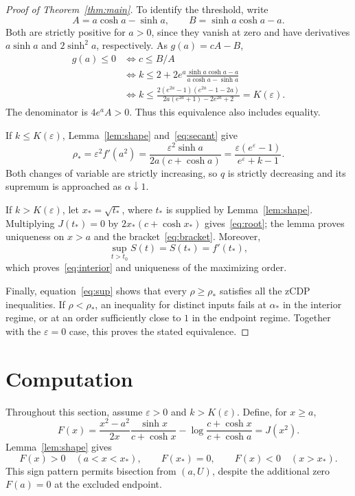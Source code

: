 \documentclass[11pt]{article}
\begin{document}
\begin{proof}[Proof of Theorem~\ref{thm:main}]
To identify the threshold, write
\[
 A=a\cosh a-\sinh a,\qquad B=\sinh a\cosh a-a.
\]
Both are strictly positive for $a>0$, since they vanish at zero and have
derivatives $a\sinh a$ and $2\sinh^2a$, respectively. As $g(a)=cA-B$,
\begin{align*}
 g(a)\leq0
 &\iff c\leq B/A\\
 &\iff k\leq2+2e^a\frac{\sinh a\cosh a-a}{a\cosh a-\sinh a}\\
 &\iff k\leq
 \frac{2(e^{2a}-1)(e^{2a}-1-2a)}
 {2a(e^{2a}+1)-2e^{2a}+2}=K(\varepsilon).
\end{align*}
The denominator is $4e^aA>0$. Thus this equivalence also includes equality.

If $k\leq K(\varepsilon)$, Lemma~\ref{lem:shape}
and~\eqref{eq:secant} give
\[
 \rho_* =\varepsilon^2 f'(a^2)
 =\frac{\varepsilon^2\sinh a}{2a(c+\cosh a)}
 =\frac{\varepsilon(e^\varepsilon-1)}{e^\varepsilon+k-1}.
\]
Both changes of variable are strictly increasing, so $q$ is strictly
decreasing and its supremum is approached as $\alpha\downarrow1$.

If $k>K(\varepsilon)$, let $x_*=\sqrt{t_*}$, where $t_*$ is supplied by
Lemma~\ref{lem:shape}. Multiplying $J(t_*)=0$ by
$2x_*(c+\cosh x_*)$ gives~\eqref{eq:root}; the lemma proves uniqueness
on $x>a$ and the bracket~\eqref{eq:bracket}. Moreover,
\[
 \sup_{t>t_0}S(t)=S(t_*)=f'(t_*),
\]
which proves~\eqref{eq:interior} and uniqueness of the maximizing order.

Finally, equation~\eqref{eq:sup} shows that every $\rho\geq\rho_*$
satisfies all the zCDP inequalities. If $\rho<\rho_*$, an inequality for
distinct inputs fails at $\alpha_*$ in the interior regime, or at an order
sufficiently close to $1$ in the endpoint regime. Together with the
$\varepsilon=0$ case, this proves the stated equivalence.
\end{proof}

\section{Computation}

Throughout this section, assume $\varepsilon>0$ and $k>K(\varepsilon)$.
Define, for
$x\geq a$,
\begin{equation}\label{eq:F}
 F(x)=\frac{x^2-a^2}{2x}\frac{\sinh x}{c+\cosh x}
       -\log\frac{c+\cosh x}{c+\cosh a}=J(x^2).
\end{equation}
Lemma~\ref{lem:shape} gives
\begin{equation}\label{eq:Fsign}
 F(x)>0\quad(a<x<x_*),\qquad
 F(x_*)=0,\qquad F(x)<0\quad(x>x_*).
\end{equation}
This sign pattern permits bisection from $(a,U)$, despite the additional
zero $F(a)=0$ at the excluded endpoint.
\end{document}
